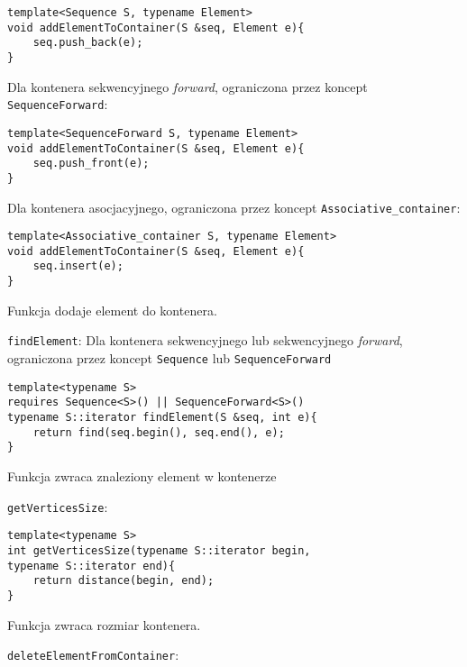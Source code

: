 \documentclass[11pt, a4paper]{article}
\begin{document}
\begin{lstlisting}[frame=single]
template<Sequence S, typename Element>
void addElementToContainer(S &seq, Element e){
    seq.push_back(e);
}
\end{lstlisting}

\noindent Dla kontenera sekwencyjnego \emph{forward}, ograniczona przez koncept \verb#SequenceForward#:

\begin{lstlisting}[frame=single]
template<SequenceForward S, typename Element>
void addElementToContainer(S &seq, Element e){
    seq.push_front(e);
}
\end{lstlisting}

\noindent Dla kontenera asocjacyjnego, ograniczona przez koncept \verb#Associative_container#:

\begin{lstlisting}[frame=single]
template<Associative_container S, typename Element>
void addElementToContainer(S &seq, Element e){
    seq.insert(e);
}
\end{lstlisting}

\noindent Funkcja dodaje element do kontenera.\newline

\noindent \verb#findElement#:\newline \newline
\noindent Dla kontenera sekwencyjnego lub sekwencyjnego \emph{forward}, ograniczona przez koncept \verb#Sequence# lub \verb#SequenceForward#
\begin{lstlisting}[frame=single]
template<typename S>
requires Sequence<S>() || SequenceForward<S>()
typename S::iterator findElement(S &seq, int e){
    return find(seq.begin(), seq.end(), e);
}
\end{lstlisting}

\noindent Funkcja zwraca znaleziony element w kontenerze \newline

\noindent \verb#getVerticesSize#:
\begin{lstlisting}[frame=single]
template<typename S>
int getVerticesSize(typename S::iterator begin, 
typename S::iterator end){
    return distance(begin, end);
}
\end{lstlisting}

\noindent Funkcja zwraca rozmiar kontenera.\newline

\noindent \verb#deleteElementFromContainer#:\newline
\end{document}
